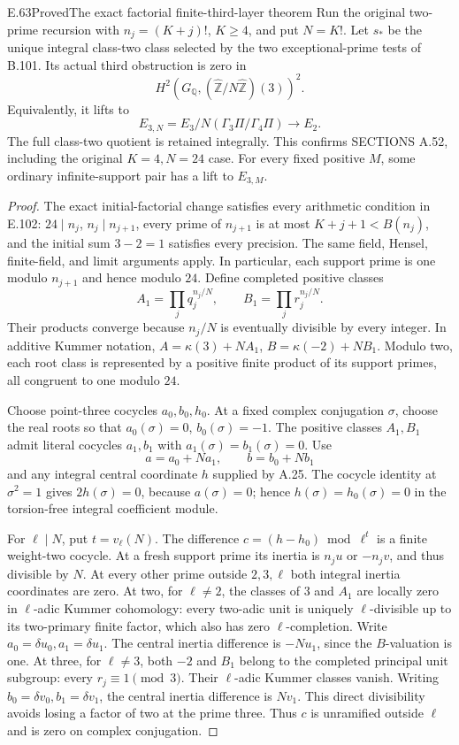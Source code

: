 \begin{result}{E.63}{Proved}{The exact factorial finite-third-layer theorem}
\label{coh:finite-third-factorial}
Run the original two-prime recursion with
$n_j=(K+j)!$, $K\geq4$, and put $N=K!$.
Let $s_*$ be the unique integral class-two
class selected by the two exceptional-prime
tests of B.101. Its actual third obstruction
is zero in
\[
 H^2(G_{\mathbb Q},
           (\widehat{\mathbb Z}/N\widehat{\mathbb Z})(3))^2.
\]
Equivalently, it lifts to
\[
 E_{3,N}=
 E_3/N(\Gamma_3\Pi/\Gamma_4\Pi)
                 \longrightarrow E_2 .
\]
The full class-two quotient is retained
integrally. This confirms SECTIONS A.52,
including the original $K=4,N=24$ case.
For every fixed positive $M$, some ordinary
infinite-support pair has a lift to $E_{3,M}$.
\end{result}
\begin{proof}
The exact initial-factorial change satisfies
every arithmetic condition in E.102:
$24\mid n_j$, $n_j\mid n_{j+1}$, every
prime of $n_{j+1}$ is at most $K+j+1<B(n_j)$,
and the initial sum $3-2=1$ satisfies
every precision. The same field, Hensel,
finite-field, and limit arguments apply.
In particular, each support prime is one
modulo $n_{j+1}$ and hence modulo $24$.
Define completed positive classes
\[
 A_1=\prod_jq_j^{n_j/N},\qquad
 B_1=\prod_jr_j^{n_j/N}.
\]
Their products converge because $n_j/N$
is eventually divisible by every integer.
In additive Kummer notation,
$A=\kappa(3)+NA_1$, $B=\kappa(-2)+NB_1$.
Modulo two, each root class is represented
by a positive finite product of its support
primes, all congruent to one modulo $24$.

Choose point-three cocycles $a_0,b_0,h_0$.
At a fixed complex conjugation $\sigma$,
choose the real roots so that
$a_0(\sigma)=0$, $b_0(\sigma)=-1$.
The positive classes $A_1,B_1$ admit
literal cocycles $a_1,b_1$ with
$a_1(\sigma)=b_1(\sigma)=0$.
Use
\[
 a=a_0+Na_1,\qquad b=b_0+Nb_1
\]
and any integral central coordinate $h$
supplied by A.25. The cocycle identity
at $\sigma^2=1$ gives $2h(\sigma)=0$,
because $a(\sigma)=0$; hence
$h(\sigma)=h_0(\sigma)=0$ in the
torsion-free integral coefficient module.

For $\ell\mid N$, put $t=v_\ell(N)$.
The difference $c=(h-h_0)\bmod\ell^t$
is a finite weight-two cocycle.
At a fresh support prime its inertia
is $n_ju$ or $-n_jv$, and thus divisible
by $N$. At every other prime outside
$2,3,\ell$ both integral inertia
coordinates are zero.
At two, for $\ell\ne2$, the classes of
$3$ and $A_1$ are locally zero in
$\ell$-adic Kummer cohomology: every
two-adic unit is uniquely $\ell$-divisible
up to its two-primary finite factor,
which also has zero $\ell$-completion.
Write $a_0=\delta u_0,a_1=\delta u_1$.
The central inertia difference is
$-Nu_1$, since the $B$-valuation is one.
At three, for $\ell\ne3$, both $-2$ and
$B_1$ belong to the completed principal
unit subgroup: every $r_j\equiv1\pmod3$.
Their $\ell$-adic Kummer classes vanish.
Writing $b_0=\delta v_0,b_1=\delta v_1$,
the central inertia difference is $Nv_1$.
This direct divisibility avoids losing
a factor of two at the prime three.
Thus $c$ is unramified outside $\ell$
and is zero on complex conjugation.


\end{proof}
